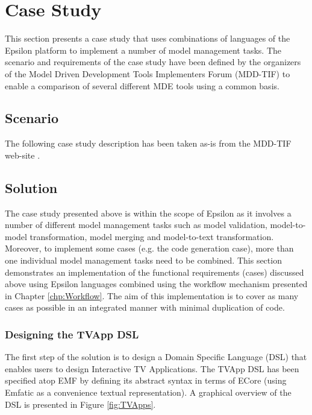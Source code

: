\section{Case Study}
\label{sec:Evaluation.CaseStudy}

This section presents a case study that uses combinations of languages of the Epsilon platform to implement a number of model management tasks. The scenario and requirements of the case study have been defined by the organizers of the Model Driven Development Tools Implementers Forum (MDD-TIF) \cite{MDDTIF} to enable a comparison of several different MDE tools using a common basis.

\subsection{Scenario}

The following case study description has been taken as-is from the MDD-TIF web-site \cite{MDDTIF}.



\subsection{Solution}

The case study presented above is within the scope of Epsilon as it involves a number of different model management tasks such as model validation, model-to-model transformation, model merging and model-to-text transformation. Moreover, to implement some cases (e.g. the code generation case), more than one individual model management tasks need to be combined. This section demonstrates an implementation of the functional requirements (cases) discussed above using Epsilon languages combined using the workflow mechanism presented in Chapter \ref{chp:Workflow}. The aim of this implementation is to cover as many cases as possible in an integrated manner with minimal duplication of code.

\subsubsection{Designing the TVApp DSL}

The first step of the solution is to design a Domain Specific Language (DSL) that enables users to design Interactive TV Applications. The TVApp DSL has been specified atop EMF by defining its abstract syntax in terms of ECore (using Emfatic \cite{Emfatic} as a convenience textual representation). A graphical overview of the DSL is presented in Figure \ref{fig:TVApps}.

